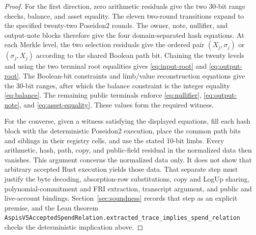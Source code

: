\begin{proof}
For the first direction, zero arithmetic residuals give the two 30-bit range
checks, balance, and asset equality.  The eleven two-round transitions expand
to the specified twenty-two Poseidon2 rounds.  The owner, note, nullifier, and
output-note blocks therefore give the four domain-separated hash equations.
At each Merkle level, the two selection residuals give the ordered pair
\((X_j,\sigma_j)\) or \((\sigma_j,X_j)\) according to the shared Boolean path
bit.  Chaining the twenty levels and using the two terminal root equalities gives
\eqref{eq:input-root} and \eqref{eq:output-root}.  The Boolean-bit constraints
and limb/value reconstruction equations give the 30-bit ranges, after which the
balance constraint is the integer equality \eqref{eq:balance}.  The remaining
public terminals enforce \eqref{eq:nullifier}, \eqref{eq:output-note}, and
\eqref{eq:asset-equality}.  These values form the required witness.

For the converse, given a witness satisfying the displayed equations, fill each
hash block with the deterministic Poseidon2 execution, place the common path
bits and siblings in their registry cells, and use the stated 10-bit limbs.
Every arithmetic, hash, path, copy, and public-field residual in the normalized
data then vanishes.  This
argument concerns the normalized data only.  It does not show that arbitrary
accepted Rust execution yields those data.  That separate step must justify
the byte decoding, absorption-row substitutions, copy and LogUp sharing,
polynomial-commitment and FRI extraction, transcript argument, and public and
live-account bindings.  Section~\ref{sec:soundness} records that step as an
explicit premise, and the Lean theorem
\texttt{AspisV5AcceptedSpendRelation.extracted\_trace\_implies\_spend\_relation}
checks the deterministic implication above.
\end{proof}


